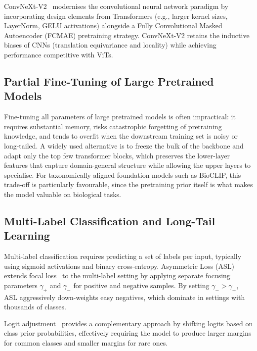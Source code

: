 ConvNeXt-V2~\cite{woo2023convnextv2} modernises the convolutional neural network paradigm by incorporating design elements from Transformers (e.g., larger kernel sizes, LayerNorm, GELU activations) alongside a Fully Convolutional Masked Autoencoder (FCMAE) pretraining strategy. ConvNeXt-V2 retains the inductive biases of CNNs (translation equivariance and locality) while achieving performance competitive with ViTs.

\subsection{Partial Fine-Tuning of Large Pretrained Models}

Fine-tuning all parameters of large pretrained models is often impractical: it requires substantial memory, risks catastrophic forgetting of pretraining knowledge, and tends to overfit when the downstream training set is noisy or long-tailed. A widely used alternative is to freeze the bulk of the backbone and adapt only the top few transformer blocks, which preserves the lower-layer features that capture domain-general structure while allowing the upper layers to specialise. For taxonomically aligned foundation models such as BioCLIP, this trade-off is particularly favourable, since the pretraining prior itself is what makes the model valuable on biological tasks.

\subsection{Multi-Label Classification and Long-Tail Learning}

Multi-label classification requires predicting a set of labels per input, typically using sigmoid activations and binary cross-entropy. Asymmetric Loss (ASL)~\cite{ridnik2021asymmetric} extends focal loss~\cite{lin2017focal} to the multi-label setting by applying separate focusing parameters $\gamma_+$ and $\gamma_-$ for positive and negative samples. By setting $\gamma_- > \gamma_+$, ASL aggressively down-weights easy negatives, which dominate in settings with thousands of classes.

Logit adjustment~\cite{menon2021longtail} provides a complementary approach by shifting logits based on class prior probabilities, effectively requiring the model to produce larger margins for common classes and smaller margins for rare ones.
